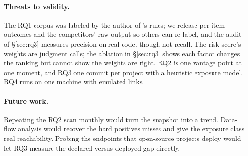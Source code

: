 \paragraph{Threats to validity.} The RQ1 corpus was labeled by the author of
\tool{}'s rules; we release per-item outcomes and the competitors' raw output
so others can re-label, and the audit of \S\ref{sec:rq3} measures precision on
real code, though not recall. The risk score's weights are judgment calls; the
ablation in \S\ref{sec:rq3} shows each factor changes the ranking but cannot
show the weights are right. RQ2 is one vantage point at one moment, and
RQ3 one commit per project with a heuristic exposure model. RQ4 runs on one
machine with emulated links.

\paragraph{Future work.} Repeating the RQ2 scan monthly would turn the
snapshot into a trend. Data-flow analysis would recover the hard positives
\tool{} misses and give the exposure class real reachability. Probing the
endpoints that open-source projects deploy would let RQ3 measure the
declared-versus-deployed gap directly.
